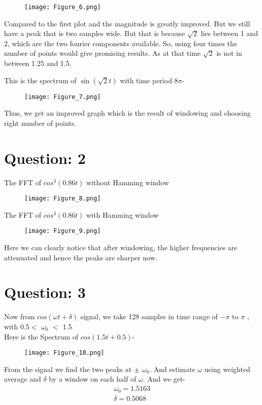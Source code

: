 \documentclass[12pt]{article}
\begin{document}
\begin{figure}[h!]
\centering
\texttt{[image: Figure\_6.png]}
\label{fig:exemplo}
\end{figure}
 Compared to the first plot and the magnitude is greatly improved. But we still have a peak that is two samples wide. But that is because $\sqrt{2}$ lies between 1 and 2, which are the two fourier components available. So, using four times the number of points would give promising results. As at that time $\sqrt{2}$ is not in between 1.25 and 1.5.
 
 
\newpage
This is the spectrum of $\sin(\sqrt{2}t)$ with time period $8\pi$-
\begin{figure}[h!]
\centering
\texttt{[image: Figure\_7.png]}
\label{fig:exemplo}
\end{figure}

Thus, we get an improved graph which is the result of windowing and choosing right number of points.

\newpage
\section*{Question: 2}
The FFT of $cos^3(0.86t)$ without Hamming window
\begin{figure}[h!]
\centering
\texttt{[image: Figure\_8.png]}
\label{fig:exemplo}
\end{figure}

The FFT of $cos^3(0.86t)$ with Hamming window
\begin{figure}[h!]
\centering
\texttt{[image: Figure\_9.png]}
\label{fig:exemplo}
\end{figure}

Here we can clearly notice that after windowing, the higher frequencies are attenuated and hence the peaks are sharper now.

\newpage
\section*{Question: 3}
Now from $cos(\omega t + \delta)$ signal, we take 128 samples in time range of $-\pi$ to $\pi$ , with 0.5$<$ $\omega_{0}$ $<$ 1.5 
\\Here is the Spectrum of $cos(1.5 t + 0.5)$-
\begin{figure}[h!]
\centering
\texttt{[image: Figure\_10.png]}
\label{fig:exemplo}
\end{figure}

From the signal we find the two peaks at $\pm$ $\omega_{0}$. And estimate $\omega$ using weighted average and $\delta$ by a window on each half of $\omega$. And we get-
\begin{equation}
  \begin{aligned}
    \omega_{0} = 1.5163\\
    \delta = 0.5068
  \end{aligned}
\end{equation}
\end{document}

